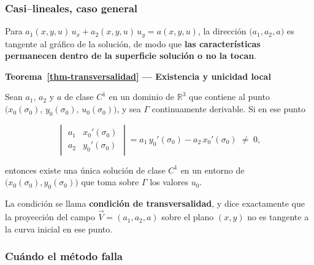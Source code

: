 \documentclass[
  spanish,
  a4paper,
]{scrbook}
\theoremstyle{definition}
\theoremstyle{plain}
\theoremstyle{definition}
\theoremstyle{plain}
\theoremstyle{definition}
\theoremstyle{remark}
\begin{document}
\subsubsection{Casi--lineales, caso
general}\label{casilineales-caso-general}

Para \(a_1(x,y,u)\,u_x + a_2(x,y,u)\,u_y = a(x,y,u)\), la dirección
\(\big(a_1,a_2,a\big)\) es tangente al gráfico de la solución, de modo
que \textbf{las características permanecen dentro de la superficie
solución o no la tocan}.

\begin{tcolorbox}[enhanced jigsaw, arc=.35mm, bottomrule=.15mm, breakable, colback=white, colframe=quarto-callout-note-color-frame, left=2mm, leftrule=.75mm, opacityback=0, rightrule=.15mm, toprule=.15mm]
\begin{minipage}[t]{5.5mm}
\textcolor{quarto-callout-note-color}{\faInfo}
\end{minipage}%
\begin{minipage}[t]{\textwidth - 5.5mm}

\vspace{-3mm}\textbf{Teorema~\ref{thm-transversalidad} --- Existencia y unicidad local}\vspace{3mm}

Sean \(a_1\), \(a_2\) y \(a\) de clase \(C^1\) en un dominio de
\(\mathbb{R}^3\) que contiene al punto
\(\big(x_0(\sigma_0),\,y_0(\sigma_0),\,u_0(\sigma_0)\big)\), y sea
\(\Gamma\) continuamente derivable. Si en ese punto

\[
\begin{vmatrix}
a_1 & x_0'(\sigma_0)\\[2pt]
a_2 & y_0'(\sigma_0)
\end{vmatrix}
= a_1\,y_0'(\sigma_0) - a_2\,x_0'(\sigma_0) \;\neq\; 0 ,
\]

entonces existe una única solución de clase \(C^1\) en un entorno de
\(\big(x_0(\sigma_0), y_0(\sigma_0)\big)\) que toma sobre \(\Gamma\) los
valores \(u_0\).

La condición se llama \textbf{condición de transversalidad}, y dice
exactamente que la proyección del campo \(\vec V=(a_1,a_2,a)\) sobre el
plano \((x,y)\) no es tangente a la curva inicial en ese punto.

\end{minipage}%
\end{tcolorbox}

\subsubsection{Cuándo el método
falla}\label{cuuxe1ndo-el-muxe9todo-falla}
\end{document}
